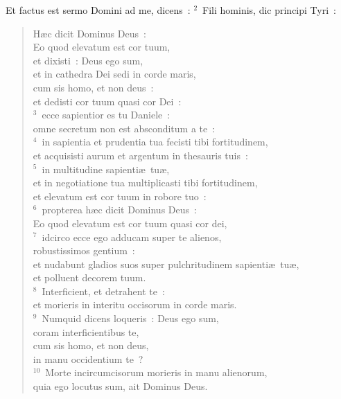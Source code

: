 \bchapter
\lettrine[lines=3,image=true,loversize=0.05,lraise=-0.03]{E}{}t factus est sermo Domini ad me, dicens~:
${}^{2}$~Fili hominis, dic principi Tyri~: \begin{flushleft}\begin{verse}H\ae c dicit Dominus Deus~:\\ Eo quod elevatum est cor tuum,\\ et dixisti~: Deus ego sum,\\ et in cathedra Dei sedi in corde maris,\\ cum sis homo, et non deus~:\\ et dedisti cor tuum quasi cor Dei~:\\
${}^{3}$~ecce sapientior es tu Daniele~:\\ omne secretum non est absconditum a te~:\\
${}^{4}$~in sapientia et prudentia tua fecisti tibi fortitudinem,\\ et acquisisti aurum et argentum in thesauris tuis~:\\
${}^{5}$~in multitudine sapienti\ae\ tu\ae ,\\ et in negotiatione tua multiplicasti tibi fortitudinem,\\ et elevatum est cor tuum in robore tuo~:\\
${}^{6}$~propterea h\ae c dicit Dominus Deus~:\\ Eo quod elevatum est cor tuum quasi cor dei,\\
${}^{7}$~idcirco ecce ego adducam super te alienos,\\ robustissimos gentium~:\\ et nudabunt gladios suos super pulchritudinem sapienti\ae\ tu\ae ,\\ et polluent decorem tuum.\\
${}^{8}$~Interficient, et detrahent te~:\\ et morieris in interitu occisorum in corde maris.\\
${}^{9}$~Numquid dicens loqueris~: Deus ego sum,\\ coram interficientibus te,\\ cum sis homo, et non deus,\\ in manu occidentium te~?\\
${}^{10}$~Morte incircumcisorum morieris in manu alienorum,\\ quia ego locutus sum, ait Dominus Deus.\end{verse}\end{flushleft}


